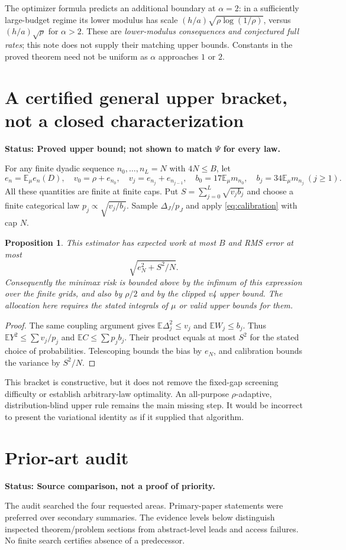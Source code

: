 \documentclass[11pt]{article}
\newtheorem{proposition}[theorem]{Proposition}
\theoremstyle{definition}\newtheorem{conjecture}[theorem]{Conjecture}
\theoremstyle{remark}\newtheorem{remark}[theorem]{Remark}
\newcommand{\E}{\mathbb E}\newcommand{\PP}{\mathbb P}\newcommand{\R}{\mathbb R}
\newcommand{\status}[1]{\par\smallskip\noindent\textbf{Status: #1.}\par}
\begin{document}
The optimizer formula predicts an additional boundary at $\alpha=2$: in a sufficiently large-budget regime its lower modulus has scale $(h/a)\sqrt{\rho\log(1/\rho)}$, versus $(h/a)\sqrt\rho$ for $\alpha>2$. These are \emph{lower-modulus consequences and conjectured full rates}; this note does not supply their matching upper bounds. Constants in the proved theorem need not be uniform as $\alpha$ approaches $1$ or $2$.

\section{A certified general upper bracket, not a closed characterization}
\status{Proved upper bound; not shown to match $\Psi$ for every law}
For any finite dyadic sequence $n_0,\ldots,n_L=N$ with $4N\le B$, let
\[
 e_n=\E_\mu e_n(D),\quad
 v_0=\rho+e_{n_0},\quad v_j=e_{n_j}+e_{n_{j-1}},\quad
 b_0=17\E_\mu m_{n_0},\quad b_j=34\E_\mu m_{n_j}\ (j\ge1).
\]
All these quantities are finite at finite caps. Put
$S=\sum_{j=0}^L\sqrt{v_jb_j}$ and choose a finite categorical law
$p_j\propto\sqrt{v_j/b_j}$. Sample $\Delta_J/p_J$ and apply \eqref{eq:calibration} with cap $N$.
\begin{proposition}\label{prop:generalupper}
This estimator has expected work at most $B$ and RMS error at most
\[
 \sqrt{e_N^2+S^2/N}.
\]
Consequently the minimax risk is bounded above by the infimum of this expression over the finite grids, and also by $\rho/2$ and by the clipped v4 upper bound. The allocation here requires the stated integrals of $\mu$ or valid upper bounds for them.
\end{proposition}
\begin{proof}
The same coupling argument gives $\E\Delta_j^2\le v_j$ and $\E W_j\le b_j$. Thus
$\E Y^2\le\sum v_j/p_j$ and $\E C\le\sum p_jb_j$. Their product equals at most $S^2$ for the stated choice of probabilities. Telescoping bounds the bias by $e_N$, and calibration bounds the variance by $S^2/N$.
\end{proof}

This bracket is constructive, but it does not remove the fixed-gap screening difficulty or establish arbitrary-law optimality. An all-purpose $\rho$-adaptive, distribution-blind upper rule remains the main missing step. It would be incorrect to present the variational identity as if it supplied that algorithm.

\section{Prior-art audit}\label{sec:audit}
\status{Source comparison, not a proof of priority}
The audit searched the four requested areas. Primary-paper statements were preferred over secondary summaries. The evidence levels below distinguish inspected theorem/problem sections from abstract-level leads and access failures. No finite search certifies absence of a predecessor.
\end{document}
